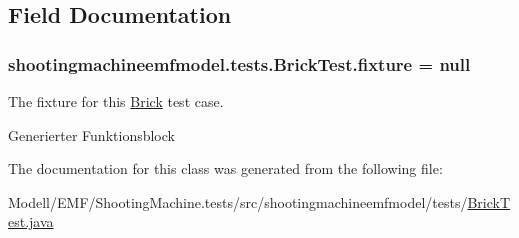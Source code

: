 \subsection{Field Documentation}
\hypertarget{classshootingmachineemfmodel_1_1tests_1_1_brick_test_a455802814ddec984a03abda399e07ee7}{
\subsubsection[{fixture}]{ shootingmachineemfmodel.\-tests.\-Brick\-Test.\-fixture = null\hspace{0.3cm}{\ttfamily [protected]}}}\label{classshootingmachineemfmodel_1_1tests_1_1_brick_test_a455802814ddec984a03abda399e07ee7}
The fixture for this \hyperlink{interfaceshootingmachineemfmodel_1_1_brick}{Brick} test case.

Generierter Funktionsblock 

The documentation for this class was generated from the following file\-:\begin{DoxyCompactItemize}
\item 
Modell/\-E\-M\-F/\-Shooting\-Machine.\-tests/src/shootingmachineemfmodel/tests/\hyperlink{_brick_test_8java}{Brick\-Test.\-java}\end{DoxyCompactItemize}
